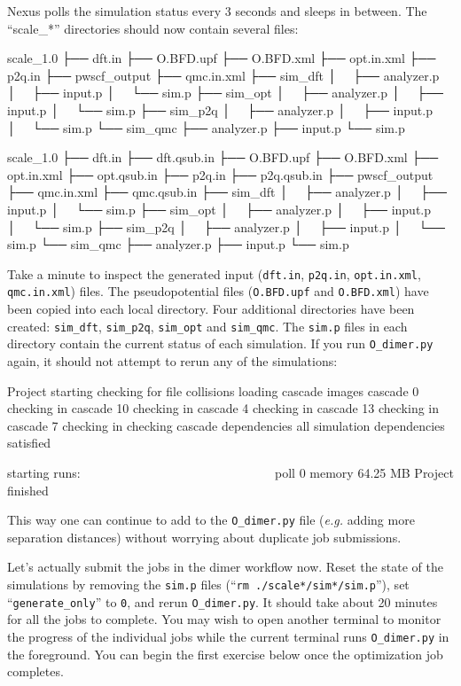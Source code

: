 \noindent
Nexus polls the simulation status every 3 seconds and sleeps in between.  The ``scale\_*'' directories should now contain several files:
\ifws
\begin{shade}
scale_1.0
├── dft.in
├── O.BFD.upf
├── O.BFD.xml
├── opt.in.xml
├── p2q.in
├── pwscf_output
├── qmc.in.xml
├── sim_dft
│   ├── analyzer.p
│   ├── input.p
│   └── sim.p
├── sim_opt
│   ├── analyzer.p
│   ├── input.p
│   └── sim.p
├── sim_p2q
│   ├── analyzer.p
│   ├── input.p
│   └── sim.p
└── sim_qmc
    ├── analyzer.p
    ├── input.p
    └── sim.p
\end{shade}
\else
\begin{shade}
scale_1.0
├── dft.in
├── dft.qsub.in
├── O.BFD.upf
├── O.BFD.xml
├── opt.in.xml
├── opt.qsub.in
├── p2q.in
├── p2q.qsub.in
├── pwscf_output
├── qmc.in.xml
├── qmc.qsub.in
├── sim_dft
│   ├── analyzer.p
│   ├── input.p
│   └── sim.p
├── sim_opt
│   ├── analyzer.p
│   ├── input.p
│   └── sim.p
├── sim_p2q
│   ├── analyzer.p
│   ├── input.p
│   └── sim.p
└── sim_qmc
    ├── analyzer.p
    ├── input.p
    └── sim.p
\end{shade}
\fi
\noindent
Take a minute to inspect the generated input (\texttt{dft.in}, \texttt{p2q.in}, \texttt{opt.in.xml}, \texttt{qmc.in.xml})  files.  The pseudopotential files (\texttt{O.BFD.upf} and \texttt{O.BFD.xml}) have been copied into each local directory. Four additional directories have been created: \texttt{sim\_dft},  \texttt{sim\_p2q}, \texttt{sim\_opt} and \texttt{sim\_qmc}.  The \texttt{sim.p} files in each directory contain the current status of each simulation.  If you run \texttt{O\_dimer.py} again, it should not attempt to rerun any of the simulations:   
\begin{shade}
Project starting 
  checking for file collisions 
  loading cascade images 
    cascade 0 checking in 
    cascade 10 checking in 
    cascade 4 checking in 
    cascade 13 checking in 
    cascade 7 checking in 
  checking cascade dependencies 
    all simulation dependencies satisfied 
  
  starting runs:
  ~~~~~~~~~~~~~~~~~~~~~~~~~~~~~~ 
  poll 0  memory 64.25 MB 
Project finished
\end{shade}
\noindent
This way one can continue to add to the \texttt{O\_dimer.py} file (\emph{e.g.} adding more separation distances) without worrying about duplicate job submissions.

Let's actually submit the jobs in the dimer workflow now.  Reset the state of the simulations by removing the \texttt{sim.p} files (``\texttt{rm ./scale*/sim*/sim.p}''), set ``\texttt{generate\_only}'' to \texttt{0}, and rerun \texttt{O\_dimer.py}.  It should take about 20 minutes for all the jobs to complete.  You may wish to open another terminal to monitor the progress of the individual jobs while the current terminal runs \texttt{O\_dimer.py} in the foreground.  You can begin the first exercise below once the optimization job completes.

